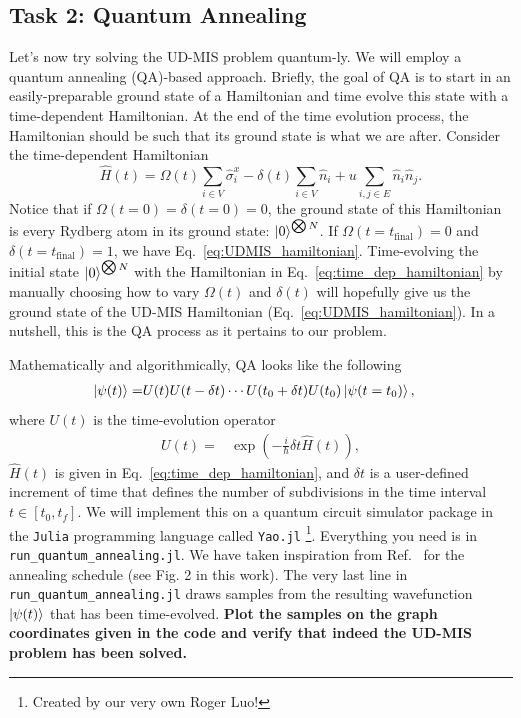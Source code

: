 \documentclass[12pt]{article}
\begin{document}
\subsection*{Task 2: Quantum Annealing}

Let's now try solving the UD-MIS problem quantum-ly.
We will employ a quantum annealing (QA)-based approach.
Briefly, the goal of QA is to start in an easily-preparable ground state of a Hamiltonian and time evolve this state with a time-dependent Hamiltonian.
At the end of the time evolution process, the Hamiltonian should be such that its ground state is what we are after.
Consider the time-dependent Hamiltonian
\begin{equation} \label{eq:time_dep_hamiltonian}
	\hat{H}(t) = \Omega(t) \sum_{i \in V} \hat{\sigma}_i^x - \delta(t) \sum_{i \in V} \hat{n}_i + u \sum_{i,j \in E} \hat{n}_i \hat{n}_j.
\end{equation}
Notice that if $\Omega(t = 0) = \delta(t = 0) = 0$, the ground state of this Hamiltonian is every Rydberg atom in its ground state: $\ket{0}^{\bigotimes N}$.
If $\Omega(t = t_{\text{final}}) = 0$ and $\delta(t = t_{\text{final}}) = 1$, we have Eq.~\ref{eq:UDMIS_hamiltonian}.
Time-evolving the initial state $\ket{0}^{\bigotimes N}$ with the Hamiltonian in Eq.~\ref{eq:time_dep_hamiltonian} by manually choosing how to vary $\Omega(t)$ and $\delta(t)$ will hopefully give us the ground state of the UD-MIS Hamiltonian (Eq.~\ref{eq:UDMIS_hamiltonian}).
In a nutshell, this is the QA process as it pertains to our problem.

Mathematically and algorithmically, QA looks like the following
\begin{align*}
	\ket{\psi(t)} =& U(t) U(t - \delta t) \cdots U(t_0 + \delta t) U(t_0) \ket{\psi (t = t_0)},
\end{align*}
where $U(t)$ is the time-evolution operator
\begin{align*}
	U(t) =& \exp(-\frac{i}{\hbar} \delta t \hat{H}(t)),
\end{align*}
$\hat{H}(t)$ is given in Eq.~\ref{eq:time_dep_hamiltonian}, and $\delta t$ is a user-defined increment of time that defines the number of subdivisions in the time interval $t \in [t_0, t_f]$.
We will implement this on a quantum circuit simulator package in the \texttt{Julia} programming language called \texttt{Yao.jl} \cite{luo_yaojl_2020}\footnote{Created by our very own Roger Luo!}.
Everything you need is in \texttt{run\_quantum\_annealing.jl}.
We have taken inspiration from Ref.~\cite{serret_solving_2020} for the annealing schedule (see Fig. 2 in this work).
The very last line in \texttt{run\_quantum\_annealing.jl} draws samples from the resulting wavefunction $\ket{\psi(t)}$ that has been time-evolved.
{\bf Plot the samples on the graph coordinates given in the code and verify that indeed the UD-MIS problem has been solved.}
\end{document}
